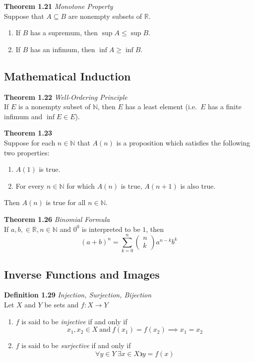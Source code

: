 \documentclass[8pt,landscape]{article}
\begin{document}
\begin{multicols}{3}
    \textbf{Theorem 1.21} \emph{Monotone Property} \\
    Suppose that $A \subseteq B$ are nonempty subsets of $\mathbb{R}$.
    \begin{enumerate}
        \item If $B$ has a supremum, then $\sup A \leq \sup B$.
        \item If $B$ has an infimum, then $\inf A \geq \inf B$.
    \end{enumerate}


    \subsection{Mathematical Induction}



    \textbf{Theorem 1.22} \emph{Well-Ordering Principle} \\
    If $E$ is a nonempty subset of $\mathbb{N}$, then $E$ has a least element
    (i.e.\ $E$ has a finite infimum and $\inf E \in E$).

    \textbf{Theorem 1.23} \\
    Suppose for each $n \in \mathbb{N}$ that $A(n)$ is a proposition which satisfies
    the following two properties:
    \begin{enumerate}
        \item $A(1)$ is true.
        \item For every $n \in \mathbb{N}$ for which $A(n)$ is true, $A(n+1)$ is also true.
    \end{enumerate}
    Then $A(n)$ is true for all $n \in \mathbb{N}$.

    \textbf{Theorem 1.26} \emph{Binomial Formula} \\
    If $a, b, \in \mathbb{R}, n \in \mathbb{N}$ and $0^0$ is interpreted to be $1$, then
    \[
        {(a+b)}^n = \sum_{k=0}^n
        \begin{pmatrix}
            n \\ k
        \end{pmatrix}
        a^{n-k} b^k
    \]


    \subsection{Inverse Functions and Images}



    \textbf{Definition 1.29} \emph{Injection, Surjection, Bijection} \\
    Let $X$ and $Y$ be sets and $f : X \to Y$
    \begin{enumerate}
        \item $f$ is said to be \emph{injective} if and only if
            \[
                x_1, x_2 \in X \ \text{and} \ f(x_1) = f(x_2) \implies x_1 = x_2
            \]
        \item $f$ is said to be \emph{surjective} if and only if
            \[
                \forall y \in Y \ \exists x \in X \backepsilon y = f(x)
            \]


\end{enumerate}
\end{multicols}
\end{document}
